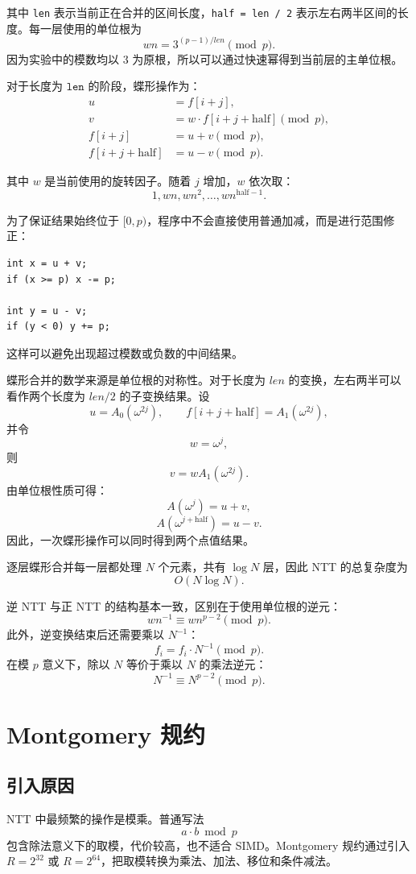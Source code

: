\documentclass[a4paper]{article}
\begin{document}
其中 \texttt{len} 表示当前正在合并的区间长度，\texttt{half = len / 2} 表示左右两半区间的长度。每一层使用的单位根为
\[
wn = 3^{(p-1)/len}\pmod p.
\]
因为实验中的模数均以 \(3\) 为原根，所以可以通过快速幂得到当前层的主单位根。

对于长度为 \(\texttt{len}\) 的阶段，蝶形操作为：
\begin{align*}
u &= f[i+j],\\
v &= w\cdot f[i+j+\text{half}]\pmod p,\\
f[i+j] &= u+v\pmod p,\\
f[i+j+\text{half}] &= u-v\pmod p.
\end{align*}

其中 \(w\) 是当前使用的旋转因子。随着 \(j\) 增加，\(w\) 依次取：
\[
1, wn, wn^2, \ldots, wn^{\text{half}-1}.
\]

为了保证结果始终位于 \([0,p)\)，程序中不会直接使用普通加减，而是进行范围修正：
\begin{lstlisting}
int x = u + v;
if (x >= p) x -= p;

int y = u - v;
if (y < 0) y += p;
\end{lstlisting}

这样可以避免出现超过模数或负数的中间结果。

蝶形合并的数学来源是单位根的对称性。对于长度为 \(len\) 的变换，左右两半可以看作两个长度为 \(len/2\) 的子变换结果。设
\[
u=A_0(\omega^{2j}),\qquad
f[i+j+\text{half}]=A_1(\omega^{2j}),
\]
并令
\[
w=\omega^j,
\]
则
\[
v=wA_1(\omega^{2j}).
\]
由单位根性质可得：
\[
A(\omega^j)=u+v,
\]
\[
A(\omega^{j+\text{half}})=u-v.
\]
因此，一次蝶形操作可以同时得到两个点值结果。

逐层蝶形合并每一层都处理 \(N\) 个元素，共有 \(\log N\) 层，因此 NTT 的总复杂度为
\[
O(N\log N).
\]

逆 NTT 与正 NTT 的结构基本一致，区别在于使用单位根的逆元：
\[
wn^{-1}\equiv wn^{p-2}\pmod p.
\]
此外，逆变换结束后还需要乘以 \(N^{-1}\)：
\[
f_i=f_i\cdot N^{-1}\pmod p.
\]
在模 \(p\) 意义下，除以 \(N\) 等价于乘以 \(N\) 的乘法逆元：
\[
N^{-1}\equiv N^{p-2}\pmod p.
\]


\section{Montgomery 规约}

\subsection{引入原因}

NTT 中最频繁的操作是模乘。普通写法
\[
a\cdot b\bmod p
\]
包含除法意义下的取模，代价较高，也不适合 SIMD。Montgomery 规约通过引入
$R=2^{32}$ 或 $R=2^{64}$，把取模转换为乘法、加法、移位和条件减法。
\end{document}
